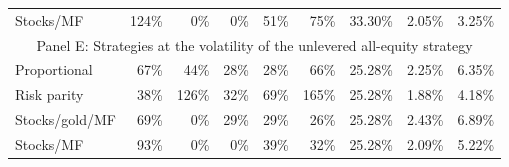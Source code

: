 \begin{table}[p]
{\begin{tabular}{lrrrrrrrr}
Stocks/MF & 124\% & 0\% & 0\% & 51\% & 75\% & 33.30\% & 2.05\% & 3.25\% \\
\multicolumn{9}{c}{Panel E: Strategies at the volatility of the unlevered all-equity strategy} \\
Proportional & 67\% & 44\% & 28\% & 28\% & 66\% & 25.28\% & 2.25\% & 6.35\% \\
Risk parity & 38\% & 126\% & 32\% & 69\% & 165\% & 25.28\% & 1.88\% & 4.18\% \\
Stocks/gold/MF & 69\% & 0\% & 29\% & 29\% & 26\% & 25.28\% & 2.43\% & 6.89\% \\
Stocks/MF & 93\% & 0\% & 0\% & 39\% & 32\% & 25.28\% & 2.09\% & 5.22\% \\
\bottomrule\end{tabular}}
\end{table}
